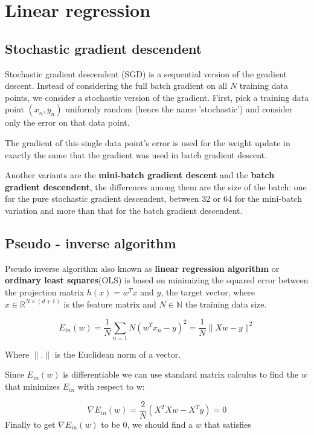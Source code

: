 
\section{ Linear regression }
\subsection{Stochastic gradient descendent}


Stochastic gradient descendent (SGD) is a sequential version of the gradient descent. Instead of considering the full batch gradient on all $N$
training data points, we consider a stochastic version of the gradient. First, pick a training data point $(x_n, y_n)$ uniformly random
(hence the name 'stochastic') and consider only the error on that data point.  \cite{LFD}

The gradient of this single data point's error is used for the weight update in exactly the same that the gradient was used in batch gradient descent.

Another variants are the \textbf{mini-batch gradient descent} and the \textbf{batch gradient descendent}, the differences among them are the size of the batch: one for the pure stochastic gradient descendent, between 32 or 64 for the mini-batch variation and more than that for the batch gradient descendent.


\subsection{Pseudo - inverse algorithm}
Pseudo inverse algorithm also known as \textbf{linear regression algorithm} or \textbf{ordinary least squares}(OLS) is based on minimizing the squared error between the 
projection matrix $h(x) = w^T x$ and $y$, the target vector, where $x \in \mathbb R^{N \times (d+1)}$ is the feature matrix and
$N \in \mathbb N$ the training data size.   

\begin{equation*}
  E_{in}(w) = \frac{1}{N} \sum_{n=1}{N} (w^T x_n - y)^2 
  = \frac{1}{N} \| Xw -y \|^2 
\end{equation*}

Where $\|.\|$ is the Euclidean norm of a vector.

Since $E_{in}(w)$ is differentiable we can use standard matrix calculus to find the $w$ that minimizes  $E_{in}$ with respect to w:

$$\nabla E_{in}(w) = \frac{2}{N}(X^TXw - X^T y) =0$$
Finally to get $\nabla  E_{in}(w)$ to be $0$, we should find a $w$ that satisfies

